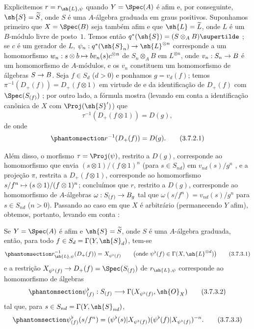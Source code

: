 \documentclass[oneside,10pt]{amsart}
\makeatletter
\newcommand{\ega@arrow}[2]{\mathchoice{#1}{#2}{#2}{#2}}
\let\ega@shortmapsto\mapsto
\renewcommand{\to}{\ega@arrow{\longrightarrow}{\rightarrow}}
\renewcommand{\mapsto}{\ega@arrow{\longmapsto}{\ega@shortmapsto}}
\let\EGAOriginalLabel\label
\renewcommand{\label}[1]{\phantomsection\EGAOriginalLabel{#1}}
\makeatother
\begin{document}
\begin{env}[3.7.2]
\label{II.3.7.2}
Explicitemos $r=r_{\sh{L},\psi}$ quando $Y=\Spec(A)$ é afim e, por conseguinte, $\sh{S}=\widetilde{S}$, onde $S$ é uma $A$-álgebra graduada em graus positivos.
Suponhamos primeiro que $X=\Spec(B)$ seja também afim e que $\sh{L}=\widetilde{L}$, onde $L$ é um $B$-módulo livre de posto~$1$.
Temos então $q^*(\sh{S})=(S\otimes_A B)\supertilde$ ;
se $c$ é um gerador de $L$, $\psi_n:q^*(\sh{S}_n)\to\sh{L}^{\otimes n}$ corresponde a um homomorfismo $w_n:s\otimes b\mapsto bv_n(s)c^{\otimes n}$ de $S_n\otimes_A B$ em $L^{\otimes n}$, onde $v_n:S_n\to B$ é um homomorfismo de $A$-módulos, e os $v_n$ constituem um homomorfismo de álgebras $S\to B$.
Seja $f\in S_d$ ($d>0$) e ponhamos $g=v_d(f)$;
temos $\pi^{-1}(D_+(f))=D_+(f\otimes1)$ em virtude de  e da identificação de $D_+(f)$ com $\Spec(S_{(f)})$ ;
por outro lado, a fórmula  mostra (levando em conta a identificação canônica de $X$ com $\Proj(\sh{S}')$) que
\[
  \tau^{-1}(D_+(f\otimes1))=D(g),
\]
de onde
\[
\label{II.3.7.2.1}
  r^{-1}(D_+(f))=D(g).
\tag{3.7.2.1}
\]

Além disso, o morfismo $\tau=\Proj(\psi)$, restrito a $D(g)$, corresponde ao homomorfismo que envia $(s\otimes1)/(f\otimes1)^n$ (para $s\in S_{nd}$) em $v_{nd}(s)/g^n$ , e a projeção $\pi$, restrita a $D_+(f\otimes1)$, corresponde ao homomorfismo $s/f^n\mapsto(s\otimes1)/(f\otimes1)^n$;
concluímos que $r$, restrito a $D(g)$, corresponde ao homomorfismo de $A$-álgebras $\omega:S_{(f)}\to B_g$ tal que $\omega(s/f^n)=v_{nd}(s)/g^n$ para $s\in S_{nd}$ ($n>0$).
Passando ao caso em que $X$ é arbitrário (permanecendo $Y$ afim), obtemos, portanto, levando em conta :
\end{env}

\begin{proposition}[3.7.3]
\label{II.3.7.3}
Se $Y=\Spec(A)$ é afim e $\sh{S}=\widetilde{S}$, onde $S$ é uma $A$-álgebra graduada, então, para todo $f\in S_d=\Gamma(Y,\sh{S}_d)$, tem-se
\[
\label{II.3.7.3.1}
  r_{\sh{L},\psi}^{-1}(D_+(f))=X_{\psi^\flat(f)}
  \qquad\bigl(\text{onde }\psi^\flat(f)\in\Gamma(X,\sh{L}^{\otimes d})\bigr)
\tag{3.7.3.1}
\]
e a restrição $X_{\psi^\flat(f)}\to D_+(f)=\Spec(S_{(f)})$ de $r_{\sh{L},\psi}$ corresponde  ao homomorfismo de álgebras
\[
\label{II.3.7.3.2}
  \psi_{(f)}^\flat:S_{(f)}\longrightarrow
  \Gamma(X_{\psi^\flat(f)},\sh{O}_X)
\tag{3.7.3.2}
\]
tal que, para $s\in S_{nd}=\Gamma(Y,\sh{S}_{nd})$,
\[
\label{II.3.7.3.3}
  \psi_{(f)}^\flat(s/f^n)
  =(\psi^\flat(s)|X_{\psi^\flat(f)})
   (\psi^\flat(f)|X_{\psi^\flat(f)})^{-n}.
\tag{3.7.3.3}
\]
\end{proposition}
\end{document}
